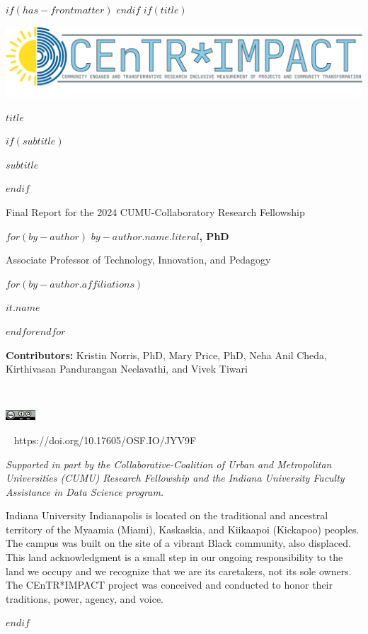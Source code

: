 $if(has-frontmatter)$
\frontmatter
$endif$
$if(title)$
\cleardoublepage
\thispagestyle{empty}
{\centering
\includegraphics[width=6in]{assets/images/centr-impact-logo.png}
{\Huge\sffamily\bfseries $title$ \par}
$if(subtitle)$
\vspace{3ex}
{\Large\sffamily\bfseries $subtitle$ \par}
$endif$
\vspace{1ex}
{\large Final Report for the 2024 CUMU-Collaboratory Research Fellowship \par}
\vspace{12ex}
$for(by-author)$
{\Large\bfseries $by-author.name.literal$, PhD  \\}
{Associate Professor of Technology, Innovation, and Pedagogy \par}
$for(by-author.affiliations)$%
{$it.name$ \par}
$endfor$$endfor$
{\textbf{Contributors:} Kristin Norris, PhD, Mary Price, PhD, Neha Anil Cheda, Kirthivasan Pandurangan Neelavathi, and Vivek Tiwari \par}
\vfill
{\textcolor{iucolor}{\aiOpenData} ~ ~ \textcolor{orange}{\aiOpenAccess} ~ ~ \textcolor{osfcolor}{\aiOSF} ~ ~ {\includegraphics[height=11pt]{assets/images/By-SA} \par}
{\textcolor{doicolor}{\aiDoi} ~ https://doi.org/10.17605/OSF.IO/JYV9F \par}
\vfill
{\small\textit{Supported in part by the Collaborative-Coalition of Urban and Metropolitan Universities (CUMU) Research Fellowship and the Indiana University Faculty Assistance in Data Science program.} \par}
\newpage
\null
{}
\vfill
{Indiana University Indianapolis is located on the traditional and ancestral territory of the Myaamia (Miami), Kaskaskia, and Kiikaapoi (Kickapoo) peoples. The campus was built on the site of a vibrant Black community, also displaced. This land acknowledgment is a small step in our ongoing responsibility to the land we occupy and we recognize that we are its caretakers, not its sole owners. The CEnTR*IMPACT project was conceived and conducted to honor their traditions, power, agency, and voice. \par}
}}
$endif$